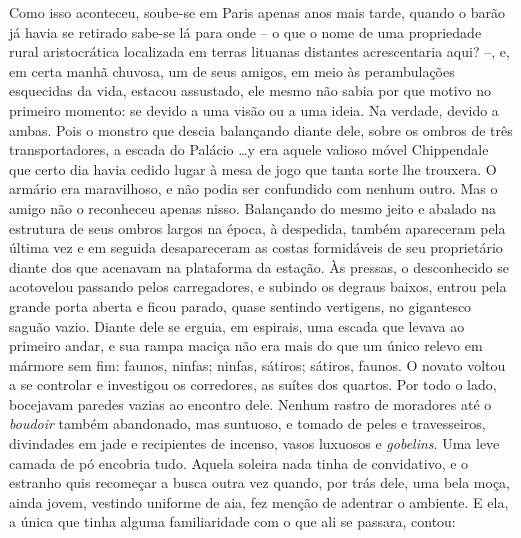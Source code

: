 Como isso aconteceu, soube-se em Paris apenas anos mais tarde, quando o
barão já havia se retirado sabe-se lá para onde -- o que o nome de uma
propriedade rural aristocrática localizada em terras lituanas distantes
acrescentaria aqui? --, e, em certa manhã chuvosa, um de seus amigos, em
meio às perambulações esquecidas da vida, estacou assustado, ele mesmo
não sabia por que motivo no primeiro momento: se devido a uma visão ou a
uma ideia. Na verdade, devido a ambas. Pois o monstro que descia
balançando diante dele, sobre os ombros de três transportadores, a
escada do Palácio \ldots{}y era aquele valioso móvel Chippendale que certo
dia havia cedido lugar à mesa de jogo que tanta sorte lhe trouxera. O
armário era maravilhoso, e não podia ser confundido com nenhum outro.
Mas o amigo não o reconheceu apenas nisso. Balançando do mesmo jeito e
abalado na estrutura de seus ombros largos na época, à despedida, também
apareceram pela última vez e em seguida desapareceram as costas
formidáveis de seu proprietário diante dos que acenavam na plataforma da
estação. Às pressas, o desconhecido se acotovelou passando pelos
carregadores, e subindo os degraus baixos, entrou pela grande porta
aberta e ficou parado, quase sentindo vertigens, no gigantesco saguão
vazio. Diante dele se erguia, em espirais, uma escada que levava ao
primeiro andar, e sua rampa maciça não era mais do que um único relevo
em mármore sem fim: faunos, ninfas; ninfas, sátiros; sátiros, faunos. O
novato voltou a se controlar e investigou os corredores, as suítes dos
quartos. Por todo o lado, bocejavam paredes vazias ao encontro dele.
Nenhum rastro de moradores até o \emph{boudoir} também abandonado, mas
suntuoso, e tomado de peles e travesseiros, divindades em jade e
recipientes de incenso, vasos luxuosos e \emph{gobelins}. Uma leve
camada de pó encobria tudo. Aquela soleira nada tinha de convidativo, e
o estranho quis recomeçar a busca outra vez quando, por trás dele, uma
bela moça, ainda jovem, vestindo uniforme de aia, fez menção de adentrar
o ambiente. E ela, a única que tinha alguma familiaridade com o que ali
se passara, contou:

